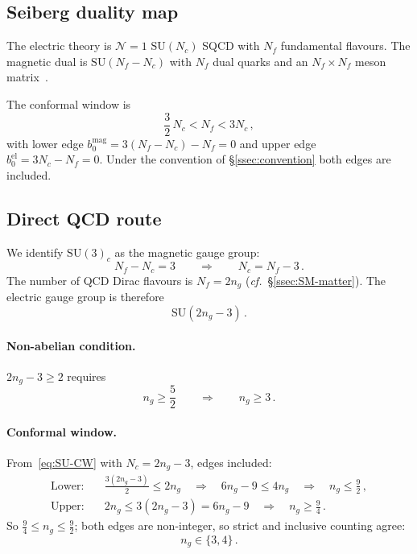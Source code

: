 \documentclass[11pt,a4paper]{article}
\theoremstyle{plain}
\theoremstyle{definition}
\theoremstyle{remark}
\newcommand{\Nc}{N_{\!c}}
\newcommand{\Nf}{N_{\!f}}
\newcommand{\ngen}{n_g}
\newcommand{\SU}[1]{\mathrm{SU}(#1)}
\newcommand{\cf}{\textit{cf.}}
\begin{document}
\subsection{Seiberg duality map}

The electric theory is $\mathcal{N}=1$ $\SU{\Nc}$ SQCD with $\Nf$
fundamental flavours.  The magnetic dual is $\SU{\Nf - \Nc}$ with $\Nf$
dual quarks and an $\Nf \times \Nf$ meson
matrix~\cite{Seiberg1995}.

The conformal window is
\begin{equation}\label{eq:SU-CW}
  \frac{3}{2}\,\Nc < \Nf < 3\Nc\,,
\end{equation}
with lower edge $b_0^{\mathrm{mag}} = 3(\Nf - \Nc) - \Nf = 0$ and upper
edge $b_0^{\mathrm{el}} = 3\Nc - \Nf = 0$.  Under the convention of
\S\ref{ssec:convention} both edges are included.

\subsection{Direct QCD route}
\label{ssec:direct-QCD}

We identify $\SU{3}_c$ as the magnetic gauge group:
\begin{equation}\label{eq:SU-magnetic}
  \Nf - \Nc = 3
  \qquad\Longrightarrow\qquad
  \Nc = \Nf - 3\,.
\end{equation}
The number of QCD Dirac flavours is $\Nf = 2\ngen$
(\cf~\S\ref{ssec:SM-matter}).  The electric gauge group is therefore
\begin{equation}\label{eq:SU-electric}
  \boxed{\SU{2\ngen - 3}}\,.
\end{equation}

\paragraph{Non-abelian condition.}
$2\ngen - 3 \geq 2$ requires
\begin{equation}\label{eq:SU-bound}
  \boxed{\ngen \geq \frac{5}{2}
  \qquad\Longrightarrow\qquad \ngen \geq 3}\,.
\end{equation}

\paragraph{Conformal window.}
From~\eqref{eq:SU-CW} with $\Nc = 2\ngen - 3$, edges included:
\begin{align}
  \text{Lower:}&\quad \frac{3(2\ngen - 3)}{2} \leq 2\ngen
  \quad\Longrightarrow\quad
  6\ngen - 9 \leq 4\ngen
  \quad\Longrightarrow\quad
  \ngen \leq \frac{9}{2}\,,
  \label{eq:SU-CW-lower} \\
  \text{Upper:}&\quad 2\ngen \leq 3(2\ngen - 3) = 6\ngen - 9
  \quad\Longrightarrow\quad
  \ngen \geq \frac{9}{4}\,.
  \label{eq:SU-CW-upper}
\end{align}
So $\frac{9}{4} \leq \ngen \leq \frac{9}{2}$; both edges are
non-integer, so strict and inclusive counting agree:
\begin{equation}\label{eq:SU-CW-ng}
  \ngen \in \{3, 4\}\,.
\end{equation}
\end{document}
